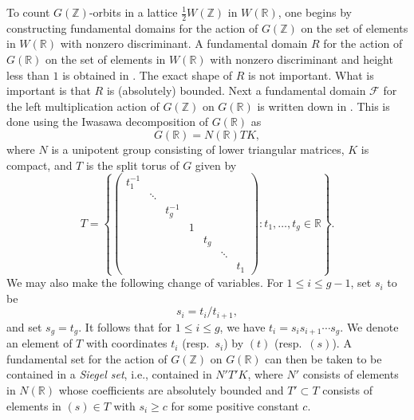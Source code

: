 \documentclass[11pt]{article}
\def\Z{{\mathbb Z}}
\def\R{{\mathbb R}}
\def\FF{{\mathcal F}}
\def\Z{{\mathbb Z}}
\begin{document}
To count $G(\Z)$-orbits in a lattice $\frac12W(\Z)$ in $W(\R)$, one
begins by constructing fundamental domains for the action of $G(\Z)$
on the set of elements in $W(\R)$ with nonzero discriminant. A
fundamental domain $R$ for the action of $G(\R)$ on the set of
elements in $W(\R)$ with nonzero discriminant and height less than $1$
is obtained in \cite[\S9.1]{BG2}. The exact shape of $R$ is not
important. What is important is that $R$ is (absolutely) bounded. Next
a fundamental domain $\FF$ for the left multiplication action of
$G(\Z)$ on $G(\R)$ is written down in \cite[\S9.2]{BG2}. This is done
using the Iwasawa decomposition of $G(\R)$ as
$$
G(\R)=N(\R)TK,
$$ where $N$ is a unipotent group consisting of lower triangular matrices, $K$ is compact, and $T$ is the split torus of $G$ given by
\begin{equation*}
T=
\left\{\left(\begin{array}{ccccccc}
 t_1^{-1}&&&&&&\\
&\ddots &&&&&  \\
 && t_{g}^{-1} &&&&\\
&&& 1 &&&\\
 &&&& t_g &&\\
&&&&&\ddots &  \\
& &&&&& t_{1}
\end{array}\right):t_1,\ldots,t_g\in\R\right\}.
\end{equation*}
We may also make the following change of variables. For $1\leq
i\leq g-1$, set $s_i$ to be
$$
s_i=t_i/t_{i+1},
$$ and set $s_g=t_g$.  It follows that for $1\leq i\leq g$, we have
$t_i = s_is_{i+1}\cdots s_g.$ We denote an element of $T$ with
coordinates $t_i$ (resp.\ $s_i$) by $(t)$ (resp.\ $(s)$). A
fundamental set for the action of $G(\Z)$ on $G(\R)$ can then be taken
to be contained in a {\it Siegel set}, i.e., contained in $N'T'K$,
where $N'$ consists of elements in $N(\R)$ whose coefficients are
absolutely bounded and $T'\subset T$ consists of elements in $(s)\in
T$ with $s_i\geq c$ for some positive constant $c$.
\end{document}
